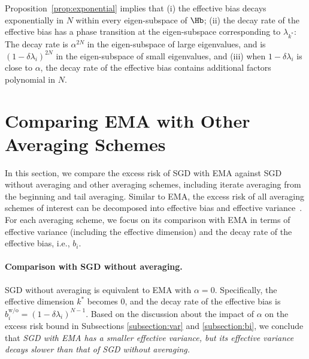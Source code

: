 \documentclass[11pt]{article}
\begin{document}
Proposition~\ref{prop:exponential} implies that (i) the effective bias decays exponentially in $N$ within every eigen-subspace of $\Hb$; (ii) the decay rate of the effective bias has a phase transition at the eigen-subspace corresponding to $\lambda_{k^*}$: The decay rate is $\alpha^{2N}$ in the eigen-subspace of large eigenvalues, and is $(1-\delta\lambda_i)^{2N}$ in the eigen-subspace of small eigenvalues, and (iii) when $1-\delta\lambda_i$ is close to $\alpha$, the decay rate of the effective bias contains additional factors polynomial in $N$.

\section{Comparing EMA with Other Averaging Schemes}\label{section:compare_averaging}

In this section, we compare the excess risk of SGD with EMA against SGD without averaging and other averaging schemes, including iterate averaging from the beginning and tail averaging. Similar to EMA, the excess risk of all averaging schemes of interest can be decomposed into effective bias and effective variance~\citep{zou2021benign}. For each averaging scheme, we focus on its comparison with EMA in terms of effective variance (including the effective dimension) and the decay rate of the effective bias, i.e., $b_i$.

\paragraph{Comparison with SGD without averaging.}
SGD without averaging is equivalent to EMA with $\alpha=0$.
Specifically, the effective dimension $k^*$ becomes $0$, and the decay rate of the effective bias is $b_i^{\mathrm{w/o}}=(1-\delta\lambda_i)^{N-1}$.
Based on the discussion about the impact of $\alpha$ on the excess risk bound in Subsections \ref{subsection:var} and \ref{subsection:bi}, we conclude that \emph{SGD with EMA has a smaller effective variance, but its effective variance decays slower than that of SGD without averaging.}
\end{document}
